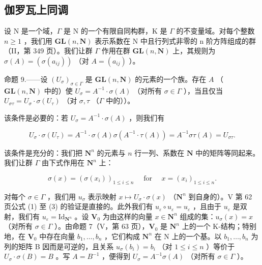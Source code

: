 \subsection{伽罗瓦上同调}

设 N 是一个域，\(\Gamma\) 是 N 的一个有限自同构群，K 是 \(\Gamma\) 的不变量域。对每个整数 \(n \geqslant 1\) ，我们用 \(\mathbf{GL}(n, \mathbf{N})\) 表示系数在 N 中且行列式非零的 n 阶方阵组成的群（II，第 349 页）。我们让群 \(\Gamma\) 作用在群 \(\mathbf{GL}(n, \mathbf{N})\) 上，其规则为 \(\sigma(A) = (\sigma(a_{ij}))\) （对 \(A = (a_{ij})\) ）。

命题 9.——设 \((U_{\sigma})_{\sigma \in \Gamma}\) 是 \(\mathbf{GL}(n, \mathbf{N})\) 的元素的一个族。存在 \(A\) （\(\mathbf{GL}(n, \mathbf{N})\) 中的）使 \(U_{\sigma} = A^{-1} \cdot \sigma(A)\) （对所有 \(\sigma \in \Gamma\) ），当且仅当 \(U_{\sigma\tau} = U_{\sigma} \cdot \sigma(U_{\tau})\) （对 \(\sigma, \tau\) （\(\Gamma\) 中的））。

该条件是必要的：若 \(U_{\sigma} = A^{-1} \cdot \sigma(A)\) ，则我们有

\[
U _ {\sigma} \cdot \sigma (U _ {\tau}) = A ^ {- 1} \cdot \sigma (A) \sigma (A ^ {- 1} \cdot \tau (A)) = A ^ {- 1} \sigma \tau (A) = U _ {\sigma \tau}.
\]

该条件是充分的：我们把 \(\mathbf{N}^n\) 的元素与 \(n\) 行一列、系数在 \(\mathbf{N}\) 中的矩阵等同起来。我们让群 \(\Gamma\) 由下式作用在 \(\mathbf{N}^n\) 上：

\[
\sigma (x) = \left(\sigma \left(x _ {i}\right)\right) _ {1 \leqslant i \leqslant n} \quad \text { for } \quad x = \left(x _ {i}\right) _ {1 \leqslant i \leqslant n}.
\]

对每个 \(\sigma \in \Gamma\) ，我们用 \(u_{\sigma}\) 表示映射 \(x \mapsto U_{\sigma} \cdot \sigma(x)\) （\(\mathbf{N}^n\) 到自身的）。V 第 62 页公式 (1) 至 (3) 的验证是直接的。此外我们有 \(u_{\varepsilon} \circ u_{\varepsilon} = u_{\varepsilon}\) ，且由于 \(u_{\varepsilon}\) 是双射，我们有 \(u_{\varepsilon} = \mathrm{Id}_{\mathbf{N}^n}\) 。设 \(\mathbf{V}_0\) 为由这样的向量 \(x \in \mathbf{N}^n\) 组成的集：\(u_{\sigma}(x) = x\) （对所有 \(\sigma \in \Gamma\) ）。由命题 7（V，第 63 页），\(\mathbf{V}_0\) 是 \(\mathbf{N}^n\) 上的一个 K-结构；特别地，在 \(\mathbf{V}_0\) 中存在向量 \(b_1, \ldots, b_n\) ，它们构成 \(\mathbf{N}^n\) 在 N 上的一个基。以 \(b_1, \ldots, b_n\) 为列的矩阵 B 因而是可逆的，且关系 \(u_{\sigma}(b_i) = b_i\) （对 \(1 \leqslant i \leqslant n\) ）等价于 \(U_{\sigma} \cdot \sigma(B) = B\) 。写 \(A = B^{-1}\) ，便得到 \(U_{\sigma} = A^{-1}\sigma(A)\) （对所有 \(\sigma \in \Gamma\) ）。

